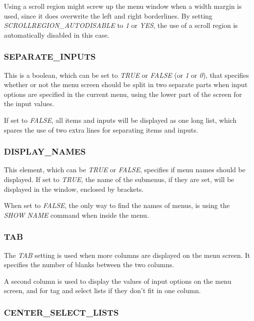 \documentclass[a4paper]{book}
\begin{document}
Using a scroll region might screw up the menu window when a width margin is 
used, since it does overwrite the left and right borderlines. By setting 
\textsl{SCROLLREGION{\_}AUTODISABLE} to \textsl{1} or \textsl{YES}, the use of a scroll region is 
automatically disabled in this case.

\subsubsection{SEPARATE{\_}INPUTS}

This is a boolean, which can be set to \textsl{TRUE} or \textsl{FALSE} (or \textsl{1} or \textsl{0}), that 
specifies whether or not the menu screen should be split in two separate 
parts when input options are specified in the current menu, using the lower 
part of the screen for the input values.

If set to \textsl{FALSE}, all items and inputs will be displayed as one long list, 
which spares the use of two extra lines for separating items and inputs.

\subsubsection{DISPLAY{\_}NAMES}

This element, which can be \textsl{TRUE} or \textsl{FALSE}, specifies if menu names should be 
displayed. If set to \textsl{TRUE}, the name of the submenus, if they are set, will 
be displayed in the window, enclosed by brackets.

When set to \textsl{FALSE}, the only way to find the names of menus, is using the 
\textsl{SHOW NAME} command 
when inside the menu.

\subsubsection{TAB}

The \textsl{TAB} setting is used when more columns are displayed on the menu screen. 
It specifies the number of blanks between the two columns.

A second column is used to display the values of input options on the menu 
screen, and for tag and select lists if they don't fit in one column.

\subsubsection{CENTER{\_}SELECT{\_}LISTS}
\end{document}
